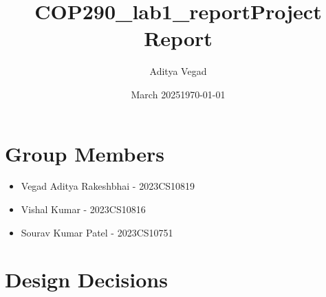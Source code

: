 \documentclass{article}
\title{COP290_lab1_report}
\author{Aditya Vegad}
\date{March 2025}
\begin{document}
\title{Project Report}
\date{\today}



\maketitle

\section*{Group Members}
\begin{itemize}
    \item Vegad Aditya Rakeshbhai - 2023CS10819
    \item Vishal Kumar - 2023CS10816
    \item Sourav Kumar Patel - 2023CS10751
\end{itemize}

\section{Design Decisions}
\end{document}
